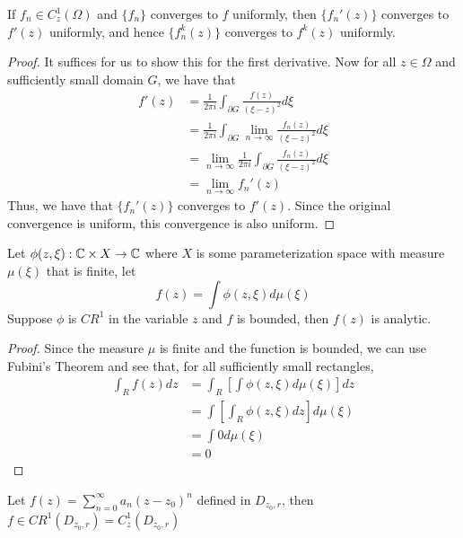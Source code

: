 \documentclass{article}
\begin{document}
\begin{corollary}
    If $f_n \in C_z^1(\Omega)$ and $\{f_n\}$ converges to $f$ uniformly, then $\{f_n'(z)\}$ converges to $f'(z)$ uniformly, and hence $\{f_n^{k}(z)\}$ converges to $f^{k}(z)$ uniformly.
\end{corollary}

\begin{proof}
It suffices for us to show this for the first derivative. Now for all $z \in \Omega$ and sufficiently small domain $G$, we have that
\begin{align*}
    f'(z) &= \frac{1}{2 \pi i} \int_{\partial G} \frac{f(z)}{(\xi - z)^2} d\xi \tag*{Cauchy's Formula for Derivatives}\\
    &= \frac{1}{2 \pi i} \int_{\partial G} \lim_{n \to \infty} \frac{f_n(z)}{(\xi - z)^2} d\xi\\
    &= \lim_{n \to \infty} \frac{1}{2 \pi i} \int_{\partial G} \frac{f_n(z)}{(\xi - z)^2} d\xi \tag*{Uniform Convergence}\\
    &= \lim_{n \to \infty} f_n'(z) \tag*{Cauchy's Formula for Derivatives}
\end{align*}
Thus, we have that $\{f_n'(z)\}$ converges to $f'(z)$. Since the original convergence is uniform, this convergence is also uniform.
\end{proof}

\begin{theorem}
    Let $\phi(z, \xi): \mathbb{C} \times X \to \mathbb{C}$ where $X$ is some parameterization space with measure $\mu(\xi)$ that is finite, let
    $$f(z) = \int \phi(z, \xi) d\mu(\xi)$$
    Suppose $\phi$ is $CR^1$ in the variable $z$ and $f$ is bounded, then $f(z)$ is analytic.
\end{theorem}

\begin{proof}
    Since the measure $\mu$ is finite and the function is bounded, we can use Fubini's Theorem and see that, for all sufficiently small rectangles,
    \begin{align*}
        \int_R f(z) dz &= \int_R [\int \phi(z, \xi) d\mu(\xi)] dz\\
        &= \int [\int_R \phi(z, \xi) dz] d\mu(\xi) \tag*{Fubini's Theorem}\\
        &= \int 0 d\mu(\xi) \tag*{$\phi$ is $CR^1$ in the variable $z$}\\
        &= 0
    \end{align*}
\end{proof}

\begin{corollary}
    Let $f(z) = \sum_{n = 0}^\infty a_n (z - z_0)^n$ defined in $D_{z_0, r}$, then $f \in CR^1(D_{z_0, r}) = C_z^1(D_{z_0, r})$
\end{corollary}
\end{document}
